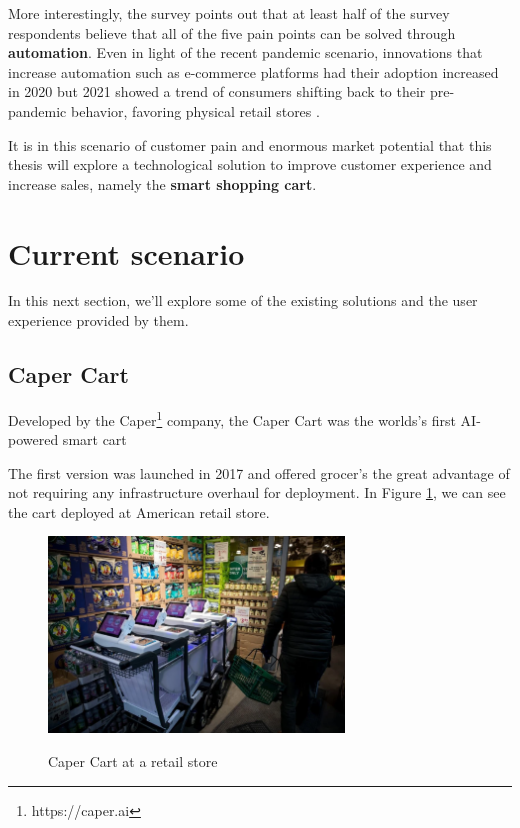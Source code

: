 More interestingly, the survey points out that at least half of the survey
respondents believe that all of the five pain points can be solved through
\textbf{automation}. Even in light of the recent pandemic scenario, innovations
that increase automation such as e-commerce platforms had their adoption
increased in 2020 but 2021 showed a trend of consumers shifting
back to their pre-pandemic behavior, favoring physical retail stores
\cite{Kantar2022}.

It is in this scenario of customer pain and enormous market potential that this
thesis will explore a technological solution to improve customer experience and increase sales,
namely the \textbf{smart shopping cart}.

\section{Current scenario}

In this next section, we'll explore some of the existing solutions and the user experience
provided by them.

\subsection{Caper Cart}

Developed by the Caper\footnote{https://caper.ai} company, the Caper Cart was the worlds's first AI-powered smart cart \cite{Caper2020}

The first version was launched in 2017 and offered grocer's the
great advantage of not requiring any infrastructure overhaul for deployment.
In Figure \ref{fig:caperatretail}, we can see the cart deployed at American
retail store.

\begin{figure}[H]
	\centering
	\caption[Caper Cart at a retail store]{Caper Cart at a retail store}
	\includegraphics[width=0.7\textwidth]{./images/caper.png}
	\label{fig:caperatretail}
\end{figure}

